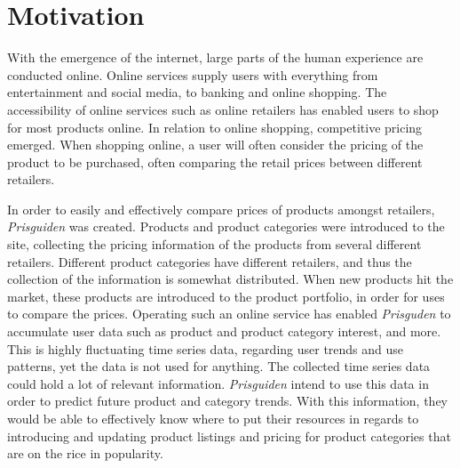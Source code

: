 \section{Motivation}
\label{section:BT:Motication}

With the emergence of the internet, large parts of the human experience are conducted online.
Online services supply users with everything from entertainment and social media, to banking and online shopping.
The accessibility of online services such as online retailers has enabled users to shop for most products online.
In relation to online shopping, competitive pricing emerged.
When shopping online, a user will often consider the pricing of the product to be purchased, often comparing the retail prices between different retailers.


In order to easily and effectively compare prices of products amongst retailers, 
\textit{Prisguiden} was created.
Products and product categories were introduced to the site, collecting the pricing information of the products from several different retailers.
Different product categories have different retailers, and thus the collection of the information is somewhat distributed.
When new products hit the market, these products are introduced to the product portfolio, in order for uses to compare the prices.
Operating such an online service has enabled \textit{Prisguden} to accumulate user data such as product and product category interest, and more.
This is highly fluctuating time series data, regarding user trends and use patterns, yet the data is not used for anything.
The collected time series data could hold a lot of relevant information.
\textit{Prisguiden} intend to use this data in order to predict future product and category trends.
With this information, they would be able to effectively know where to put their resources in regards to introducing and updating product listings and pricing for product categories 
that are on the rice in popularity.
\linebreak




